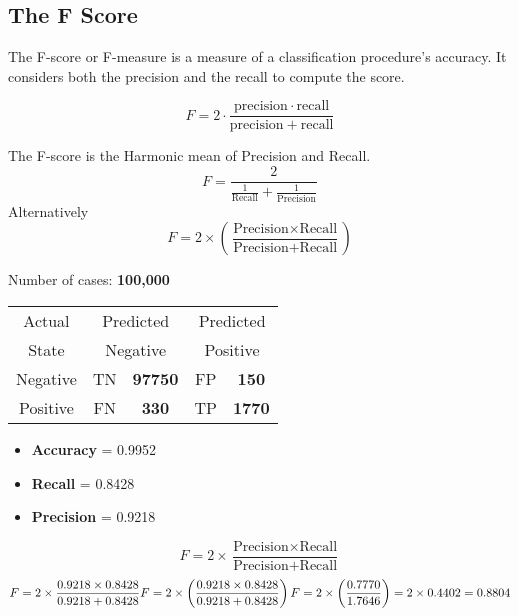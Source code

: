 \documentclass[a4paper,12pt]{article}
\begin{document}
\subsection{The F Score}

The F-score or F-measure is a measure of a classification procedure's accuracy.
It considers both the precision  and the recall to compute the score.

\[ F = 2 \cdot \frac{\mathrm{precision} \cdot \mathrm{recall}}{\mathrm{precision} + \mathrm{recall}}\]

	

 The F-score is the Harmonic mean of Precision and Recall.
	\[ F = \frac{2}{\frac{1}{\mbox{Recall}} + \frac{1}{\mbox{Precision}}} \]
	Alternatively
	\[ F = 2 \times \left( \frac{\mbox{Precision} \times \mbox{Recall}}{\mbox{Precision} + \mbox{Recall}} \right) \] 
	
	
	
	

	Number of cases: \textbf{100,000}\\ 
	\begin{center}
		\begin{table}[!htbp]
			\begin{tabular}{c  *4c}
\hline
				Actual &  \multicolumn{2}{c}{Predicted} & \multicolumn{2}{c}{Predicted}\\
				State &  \multicolumn{2}{c}{Negative} & \multicolumn{2}{c}{Positive}\\
				\hline
				Negative   & \phantom{spa} TN & \textbf{97750}\phantom{spa}   & FP  & \textbf{150}\\
				Positive   & \phantom{spa} FN & \textbf{330} \phantom{spa}   & TP  & \textbf{1770}\\
				
				\hline
			\end{tabular}
		\end{table}
	\end{center}
	\begin{itemize}
		\item \textbf{Accuracy} = 0.9952
		\item \textbf{Recall} = 0.8428
		\item \textbf{Precision} = 0.9218
	\end{itemize}
	

	\[ F = 2 \times \frac{\mbox{Precision} \times \mbox{Recall}}{\mbox{Precision} + \mbox{Recall}}\]\bigskip
	\[ F = 2 \times \frac{\mbox{0.9218} \times \mbox{0.8428}}{\mbox{0.9218} + \mbox{0.8428}} \\  F = 2 \times \left( \frac{\mbox{0.9218} \times \mbox{0.8428}}{\mbox{0.9218} + \mbox{0.8428}} \right) \\ F = 2 \times \left( \frac{0.7770}{1.7646} \right) = 2 \times 0.4402 = 0.8804 \]
\end{document}
